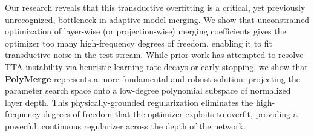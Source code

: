 Our research reveals that this transductive overfitting is a critical, yet previously unrecognized, bottleneck in adaptive model merging. We show that unconstrained optimization of layer-wise (or projection-wise) merging coefficients gives the optimizer too many high-frequency degrees of freedom, enabling it to fit transductive noise in the test stream. While prior work has attempted to resolve TTA instability via heuristic learning rate decays or early stopping, we show that \textbf{PolyMerge} represents a more fundamental and robust solution: projecting the parameter search space onto a low-degree polynomial subspace of normalized layer depth. This physically-grounded regularization eliminates the high-frequency degrees of freedom that the optimizer exploits to overfit, providing a powerful, continuous regularizer across the depth of the network.

